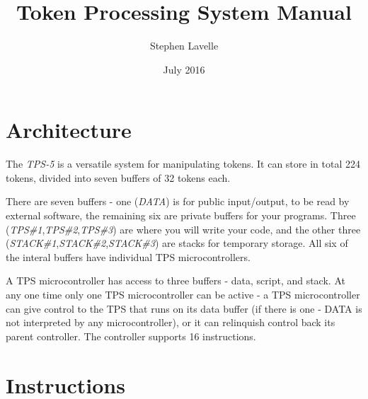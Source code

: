 \documentclass{article}
\title{Token Processing System Manual}
\author{Stephen Lavelle}
\date{July 2016}
\begin{document}
   \maketitle

\section{Architecture}

The \emph{TPS-5} is a versatile system for manipulating tokens.   It can store in total 224 tokens, divided into seven buffers of 32 tokens each.  

There are seven buffers - one (\emph{DATA}) is for public input/output, to be read by external software, the remaining six are private buffers for your programs.  Three (\emph{TPS\#1},\emph{TPS\#2},\emph{TPS\#3}) are where you will write your code, and the other three (\emph{STACK\#1},\emph{STACK\#2},\emph{STACK\#3}) are stacks for temporary storage.  All six of the interal buffers have individual TPS microcontrollers.

A TPS microcontroller has access to three buffers - data, script, and stack.  At any one time only one TPS microcontroller can be active - a TPS microcontroller can give control to the TPS that runs on its data buffer (if there is one - DATA is not interpreted by any microcontroller), or it can relinquish control back its parent controller. The controller supports 16 instructions.


\section{Instructions}
\end{document}
